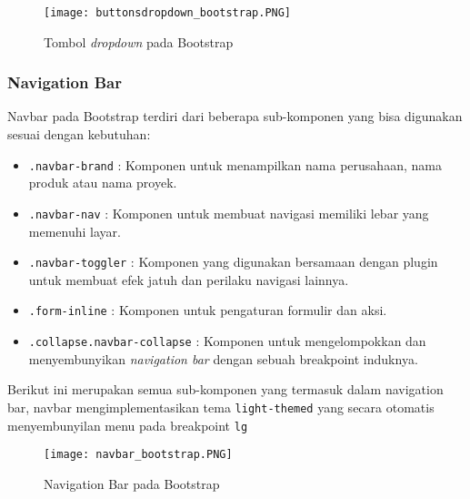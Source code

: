 \begin{figure} [H]
	\centering  
	\texttt{[image: buttonsdropdown\_bootstrap.PNG]}  
	\caption{Tombol \textit{dropdown} pada Bootstrap} 
\end{figure}

\subsubsection{Navigation Bar}
Navbar pada Bootstrap terdiri dari beberapa sub-komponen yang bisa digunakan sesuai dengan kebutuhan:
\begin{itemize}
    \item \texttt{.navbar-brand} : Komponen untuk menampilkan nama perusahaan, nama produk atau nama proyek.
    \item \texttt{.navbar-nav} : Komponen untuk membuat navigasi memiliki lebar yang memenuhi layar.
    \item \texttt{.navbar-toggler} : Komponen yang digunakan bersamaan dengan plugin untuk membuat efek jatuh dan perilaku navigasi lainnya.
    \item \texttt{.form-inline} : Komponen untuk pengaturan formulir dan aksi.
    \item \texttt{.collapse.navbar-collapse} : Komponen untuk mengelompokkan dan menyembunyikan \textit{navigation bar} dengan sebuah breakpoint induknya.
\end{itemize}
Berikut ini merupakan semua sub-komponen yang termasuk dalam navigation bar, navbar mengimplementasikan tema \texttt{light-themed} yang secara otomatis menyembunyilan menu pada breakpoint \texttt{lg}
\begin{figure} [H]
	\centering  
	\texttt{[image: navbar\_bootstrap.PNG]}  
	\caption{Navigation Bar pada Bootstrap} 
\end{figure}

